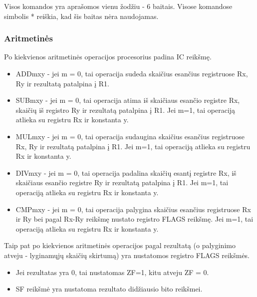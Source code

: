 \documentclass{VUMIFInfKursinis}
\begin{document}
Visos komandos yra aprašomos vienu žodžiu - 6 baitais. Visose komandose simbolis * reiškia, kad šis baitas nėra naudojamas.

\subsubsection{Aritmetinės}
Po kiekvienos aritmetinės operacijos procesorius padina IC reikšmę.
\begin{itemize}
	\item ADDmxy - jei m = 0, tai operacija sudeda skaičius esančius registruose Rx, Ry ir rezultatą patalpina į R1.
	\item SUBmxy - jei m = 0, tai operacija atima iš skaičiaus esančio registre Rx, skaičių iš registro Ry ir rezultatą patalpina į R1. Jei m=1, tai operaciją atlieka su registru Rx ir konstanta y.
	\item MULmxy - jei m = 0, tai operacija sudaugina skaičius esančius registruose Rx, Ry ir rezultatą patalpina į R1. Jei m=1, tai operaciją atlieka su registru Rx ir konstanta y.
	\item DIVmxy - jei m = 0, tai operacija padalina skaičių esantį registre Rx, iš skaičiaus esančio registre Ry ir rezultatą patalpina į R1. Jei m=1, tai operaciją atlieka su registru Rx ir konstanta y.
	\item CMPmxy - jei m = 0, tai operacija palygina skaičius esančius registruose Rx ir Ry bei pagal Rx-Ry reikšmę nustato registro FLAGS reikšmę. Jei m=1, tai operaciją atlieka su registru Rx ir konstanta y.
\end{itemize}

Taip pat po kiekvienos aritmetinės operacijos pagal rezultatą (o palyginimo atveju - lyginamųjų skaičių skirtumą) yra nustatomos registro FLAGS reikšmės.

\begin{itemize}
	\item Jei rezultatas yra 0, tai nustatomas ZF=1, kitu atveju ZF = 0.
	\item SF reikšmė yra nustatoma rezultato didžiausio bito reikšmei.
\end{itemize}
\end{document}
